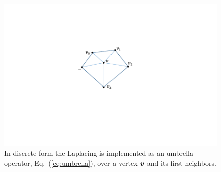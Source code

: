 \begin{figure}
\begin{center}
   \includegraphics[trim=100 110 140 90,clip,width=0.8\linewidth]{Figures/LaplacianFacets}
\end{center}
   \caption{In discrete form the Laplacing is implemented as an umbrella operator, Eq.~(\ref{eq:umbrella}), over a vertex $\boldsymbol{v}$ and its first neighbors.}
\label{fig:laplacian}
\end{figure}


